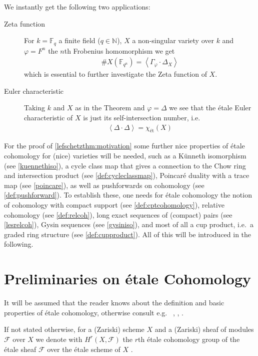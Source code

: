 \documentclass[english]{scrartcl}
\theoremstyle{definition}
\theoremstyle{remark}
\newcommand*{\N}{\mathds{N}}
\newcommand*{\fF}{\mathds{F}} %
\newcommand*{\F}{\mathcal{F}} %
\newcommand*{\idest}{i.e.\ }
\newcommand*{\forexample}{e.g.\ }
\newcommand*{\intProd}[2]{{#1\cdot#2}} %
\newcommand*{\intNum}[1]{{\left\langle{#1}\right\rangle}} %
\newcommand*{\Graph}[1]{{\Gamma_{#1}}} %
\newcommand*{\Diag}[1]{{\Delta_{#1}}} %
\renewcommand*{\phi}{\varphi}
\begin{document}
We instantly get the following two applications:
\begin{description}
\item[Zeta function] For
  $k=\fF_{q}$ a finite field ($q\in\N$),
  $X$ a non-singular variety over $k$ and
  $\phi=F^n$ the $n$th Frobenius homomorphism
  we get
  \begin{gather*}
    \#X(\fF_{q^n}) = \intNum{\intProd{\Graph\phi}{\Diag X}}
  \end{gather*}
  which is essential to further investigate the Zeta function of $X$.
\item[Euler characteristic] Taking $k$ and $X$ as in the Theorem and
  $\phi=\Delta$ we see that the étale Euler characteristic of $X$ is
  just its self-intersection number, \idest
  \begin{gather*}
    \intNum{\intProd{\Delta}{\Delta}} = \chi_{\text{ét}}(X)
  \end{gather*}
\end{description}

For the proof of \ref{lefschetzthm:motivation}
some further nice properties of étale cohomology for
(nice) varieties will be needed, such as
a Künneth isomorphism (see \autoref{kuennethiso}),
a cycle class map that gives a connection to the Chow ring and
intersection product (see \autoref{def:cycleclassmap}),
Poincaré duality with a trace map (see \autoref{poincare}),
as well as pushforwards on cohomology (see \autoref{def:pushforward}).
To establish these, one needs for étale cohomology the notion of
cohomology with compact support (see \autoref{def:cptcohomology}),
relative cohomology (see \autoref{def:relcoh}),
long exact sequences of (compact) pairs (see \autoref{lesrelcoh}),
Gysin sequences (see \autoref{gysiniso}),
and most of all a cup product, \idest a graded ring structure
(see \autoref{def:cupproduct}).
All of this will be introduced in the following.

\section{Preliminaries on étale Cohomology}
It will be assumed that the reader knows about the definition and basic
properties of étale cohomology, otherwise consult \forexample
\cite{jannsenetale}, \cite{milne}, \cite{milnebook}.

If not stated otherwise, for a (Zariski) scheme $X$ and a (Zariski)
sheaf of modules $\F$ over $X$ we denote with $H^r(X,\F)$ the $r$th
étale cohomology group of the étale sheaf $\F$ over the étale scheme
of $X$
\cite[compare][Chap.~I.6, Examples of Sheaves on $X_\text{ét}$]{milne}.
\end{document}
